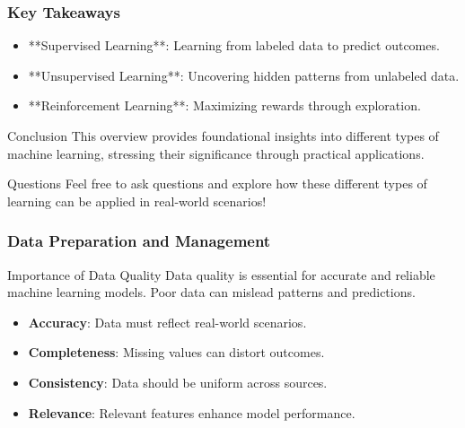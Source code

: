 \documentclass[aspectratio=169]{beamer}
\begin{document}
\begin{frame}[fragile]
    \frametitle{Key Takeaways}
    \begin{itemize}
        \item **Supervised Learning**: Learning from labeled data to predict outcomes.
        \item **Unsupervised Learning**: Uncovering hidden patterns from unlabeled data.
        \item **Reinforcement Learning**: Maximizing rewards through exploration.
    \end{itemize}
    
    \begin{block}{Conclusion}
        This overview provides foundational insights into different types of machine learning, stressing their significance through practical applications.
    \end{block}
    
    \begin{block}{Questions}
        Feel free to ask questions and explore how these different types of learning can be applied in real-world scenarios!
    \end{block}
\end{frame}

\begin{frame}[fragile]
    \frametitle{Data Preparation and Management}
    
    \begin{block}{Importance of Data Quality}
        Data quality is essential for accurate and reliable machine learning models. Poor data can mislead patterns and predictions.
        \begin{itemize}
            \item \textbf{Accuracy}: Data must reflect real-world scenarios.
            \item \textbf{Completeness}: Missing values can distort outcomes.
            \item \textbf{Consistency}: Data should be uniform across sources.
            \item \textbf{Relevance}: Relevant features enhance model performance.
        \end{itemize}
    \end{block}
\end{frame}
\end{document}
